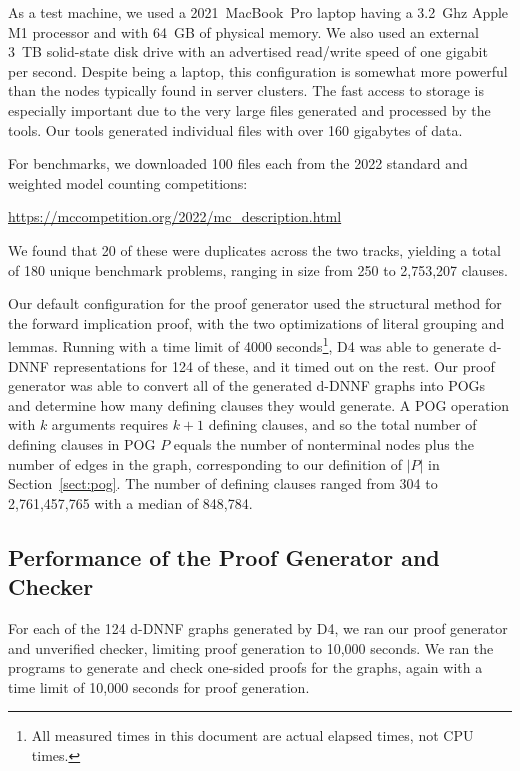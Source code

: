 \documentclass[letterpaper,USenglish,cleveref, autoref, thm-restate]{lipics-v2021}
\newcommand{\progname}[1]{\textsc{#1}}
\newcommand{\dfour}{\progname{D4}}
\begin{document}
As a test machine, we used a 2021~MacBook~Pro laptop having a 3.2~Ghz
Apple M1 processor and with 64~GB of physical memory.  We also used an
external 3~TB solid-state disk drive with an advertised read/write
speed of one gigabit per second.  Despite being a laptop, this
configuration is somewhat more powerful than the nodes typically
found in server clusters.  The fast access to storage is especially
important due to the very large files generated and processed by the
tools.  Our tools generated individual files with over 160 gigabytes
of data.

For benchmarks, we downloaded 100 files each from the 2022 standard and weighted model counting competitions:
\begin{center}
       \url{https://mccompetition.org/2022/mc_description.html}
\end{center}
We found that 20 of these were duplicates across the two tracks,
yielding a total of 180 unique benchmark problems, ranging in size
from 250 to 2,753,207 clauses.

Our default configuration for the proof generator used the structural
method for the forward implication proof, with the two optimizations
of literal grouping and lemmas.
Running with a time limit of 4000 seconds\footnote{All measured times
in this document are actual elapsed times, not CPU times.}, \dfour{}
was able to generate d-DNNF representations for 124 of these, and it timed out on the
rest.  Our proof generator was able to convert all of the generated
d-DNNF graphs into POGs and determine how many defining clauses they
would generate.  A POG operation with $k$ arguments requires $k+1$
defining clauses, and so the total number of defining clauses in POG $P$ equals
the number of nonterminal nodes plus the number of edges in the graph, corresponding to our definition of $|P|$ in Section~\ref{sect:pog}.
The number of defining clauses ranged from 304 to 2,761,457,765 with a median of 848,784.

\subsection{Performance of the Proof Generator and Checker}



For each of the 124 d-DNNF graphs generated by \dfour{}, we ran
our proof generator and unverified checker, limiting proof
generation to 10,000 seconds.  We ran the programs to generate and check
one-sided proofs for the graphs, again with a time limit of 10,000
seconds for proof generation.
\end{document}
